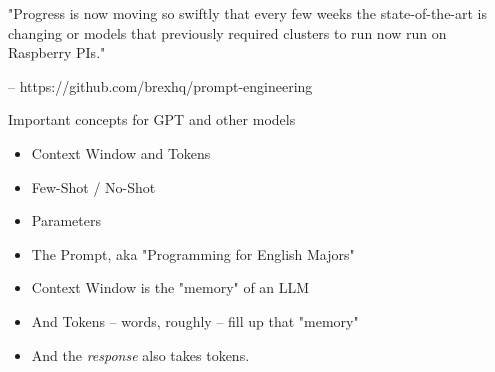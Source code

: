 \documentclass{beamer}
\begin{document}
\begin{frame}[plain]
\end{frame}

\begin{frame}
	"Progress is now moving so swiftly that every few weeks the state-of-the-art is changing or models that previously required clusters to run now run on Raspberry PIs."
	 
	 -- https://github.com/brexhq/prompt-engineering
\end{frame}

\begin{frame}{Important concepts for GPT and other models}
	\begin{itemize}
		\item Context Window and Tokens
		\pause
		\item Few-Shot / No-Shot
		\pause
		\item Parameters
		\pause
		\item The Prompt, aka "Programming for English Majors"
	\end{itemize}
\end{frame}

\begin{frame}
	\begin{itemize}
		\item Context Window is the "memory" of an LLM
		\pause
		\item And Tokens -- words, roughly -- fill up that "memory"
		\pause
		\item And the \textit{response} also takes tokens.
	\end{itemize}
\end{frame}
\end{document}
